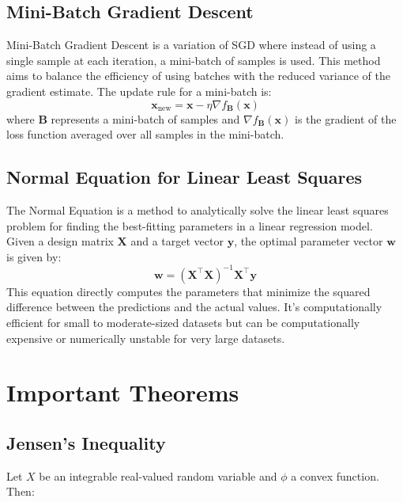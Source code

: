 \documentclass[8pt, a4paper, landscape, includeheadfoot]{extarticle}
\begin{document}
\begin{multicols*}{4}
	\subsection{Mini-Batch Gradient Descent}
	Mini-Batch Gradient Descent is a variation of SGD where instead of using a single sample at each iteration, a mini-batch of samples is used. This method aims to balance the efficiency of using batches with the reduced variance of the gradient estimate. The update rule for a mini-batch is:
	\[
		\mathbf{x}_{\text{new}} = \mathbf{x} - \eta \nabla f_{\mathbf{B}}(\mathbf{x})
	\]
	where \(\mathbf{B}\) represents a mini-batch of samples and \(\nabla f_{\mathbf{B}}(\mathbf{x})\) is the gradient of the loss function averaged over all samples in the mini-batch.

	\subsection{Normal Equation for Linear Least Squares}
	The Normal Equation is a method to analytically solve the linear least squares problem for finding the best-fitting parameters in a linear regression model. Given a design matrix \(\mathbf{X}\) and a target vector \(\mathbf{y}\), the optimal parameter vector \(\mathbf{w}\) is given by:
	\[
		\mathbf{w} = \left(\mathbf{X}^\top \mathbf{X}\right)^{-1} \mathbf{X}^\top \mathbf{y}
	\]
	This equation directly computes the parameters that minimize the squared difference between the predictions and the actual values. It's computationally efficient for small to moderate-sized datasets but can be computationally expensive or numerically unstable for very large datasets.

	\section{Important Theorems}

	\subsection{Jensen's Inequality}

	Let $X$ be an integrable real-valued random variable and $\phi$ a convex function. Then:


\end{multicols*}
\end{document}
